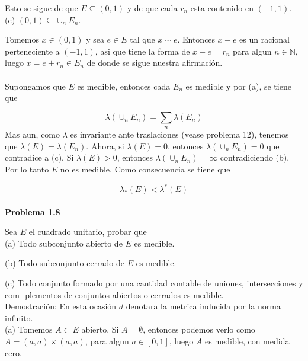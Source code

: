 \documentclass[12pt]{article}
\begin{document}
    \hspace*{14pt} Esto se sigue de que $E\subseteq (0,1)$ y de que cada $r_n$ esta contenido en $(-1,1)$.\\

    (c) $(0,1)\subseteq \cup_n E_n$. 

    \hspace*{14pt} Tomemos $x\in (0,1)$ y sea $e\in E$ tal que $x\sim e$. Entonces $x-e$ es un racional 
    \hspace*{32pt} perteneciente a $(-1,1)$, asi que tiene la forma de $x-e = r_n$ para algun 
    $n\in \mathbb{N}$, luego \hspace*{32pt} $x = e+r_n\in E_n$ de donde se sigue nuestra afirmaci\'on.  
    \\ \\
    Supongamos que $E$ es medible, entonces cada $E_n$ es medible y por (a), se tiene que 

    \[\lambda(\cup_nE_n) = \sum_n \lambda (E_n)\]
    Mas aun, como $\lambda$ es invariante ante traslaciones (vease problema 12), tenemos que 
    $\lambda (E) = \lambda (E_n)$. Ahora, si $\lambda(E) = 0$, entonces 
    $\lambda(\cup_nE_n) = 0$ que contradice a (c). Si $\lambda(E) > 0$, entonces 
    $\lambda(\cup_nE_n) = \infty$ contradiciendo (b). Por lo tanto $E$ no es medible. Como 
    consecuencia se tiene que 

    \[\lambda_*(E) < \lambda^*(E)\]
    \\

    \textbf{Problema 1.8}
    
    Sea $E$ el cuadrado unitario, probar que 
    \\

    (a) Todo subconjunto abierto de $E$ es medible.
    
    (b) Todo subconjunto cerrado de $E$ es medible.

    (c) Todo conjunto formado por una cantidad contable de uniones, intersecciones
    y com- \hspace*{32pt} plementos de conjuntos abiertos o cerrados es medible.
    \\

    Demostraci\'on: En esta ocasi\'on $d$ denotara la metrica inducida por la norma infinito. 
    \\

    (a) Tomemos $A\subset E$ abierto. Si $A = \emptyset$, entonces podemos verlo como
    $A = (a,a)\times (a,a)$, para algun $a\in [0,1]$, luego $A$ es medible, con medida cero.
    \\
    
\end{document}
